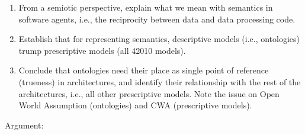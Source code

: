 \documentclass[a4paper,11pt,oneside,oldfontcommands]{memoir}
\theoremstyle{definition}
\theoremstyle{break}		%
\numberwithin{equation}{chapter}
\numberwithin{figure}{chapter}
\begin{document}
\begin{enumerate}
\def\labelenumi{\arabic{enumi}.}
\tightlist
\item
  From a semiotic perspective, explain what we mean with semantics in
  software agents, i.e., the reciprocity between data and data
  processing code.
\item
  Establish that for representing semantics, descriptive models (i.e.,
  ontologies) trump prescriptive models (all 42010 models).
\item
  Conclude that ontologies need their place as single point of reference
  (trueness) in architectures, and identify their relationship with the
  rest of the architectures, i.e., all other prescriptive models. Note
  the issue on Open World Assumption (ontologies) and CWA (prescriptive
  models).
\end{enumerate}

Argument:
\end{document}
